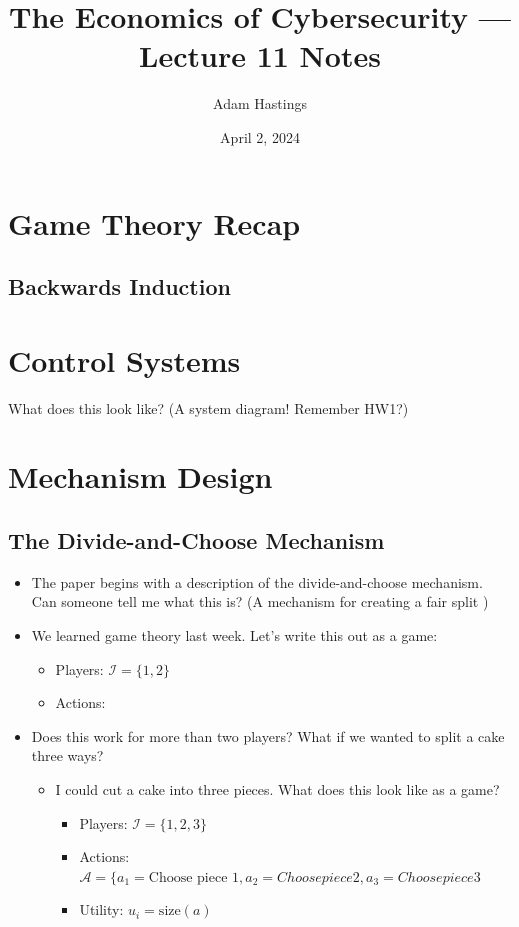 \documentclass[11pt]{article}
\title{The Economics of Cybersecurity --- Lecture 11 Notes}
\date{April 2, 2024}
\author{Adam Hastings}
\begin{document}
\maketitle

\section{Game Theory Recap}

\subsection{Backwards Induction}




\section{Control Systems}

What does this look like? (A system diagram! Remember HW1?)

\section{Mechanism Design}

\subsection{The Divide-and-Choose Mechanism}

\begin{itemize}
    \item The paper begins with a description of the divide-and-choose mechanism. Can someone tell me what this is? (A mechanism for creating a fair split )
    \item We learned game theory last week. Let's write this out as a game:
    \begin{itemize}
        \item Players: $\mathcal{I} = \{1,2\}$
        \item Actions: 
    \end{itemize}
    \item Does this work for more than two players? What if we wanted to split a cake three ways?
    \begin{itemize}
        \item I could cut a cake into three pieces. What does this look like as a game?
        \begin{itemize}
            \item Players: $\mathcal{I} = \{1,2,3\}$
            \item Actions: $\mathcal{A} = \{a_1 = \text{Choose piece 1}, a_2 = {Choose piece 2}, a_3 = {Choose piece 3}$
            \item Utility: $u_i = \text{size}(a)$
        \end{itemize}
    \end{itemize}
\end{itemize}
\end{document}
